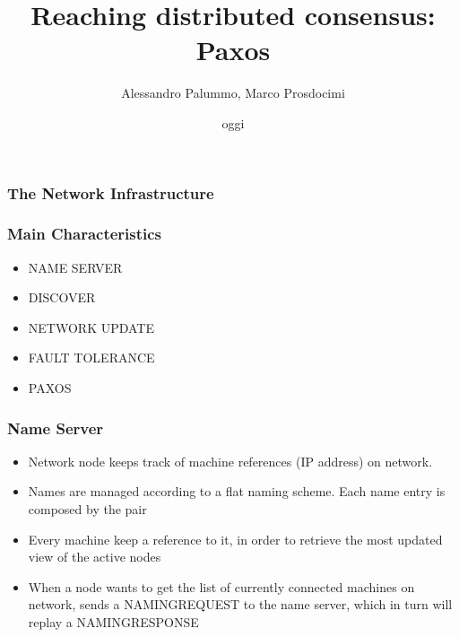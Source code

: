 \documentclass{beamer}
\title{Reaching distributed consensus: Paxos}
\author{Alessandro Palummo, Marco Prosdocimi}
\date{oggi}
\begin{document}
\begin{frame}
  \maketitle
\end{frame}

\begin{frame}
  \frametitle{The Network Infrastructure}
  
\end{frame}

\begin{frame}
  \frametitle{Main Characteristics}

  \begin{itemize}
  \item NAME SERVER
  \item DISCOVER
  \item NETWORK UPDATE
  \item FAULT TOLERANCE
  \item PAXOS
  \end{itemize}

\end{frame}

\begin{frame}
  \frametitle{Name Server}
  \begin{itemize}
  \item Network node keeps track of machine references (IP address) on network.
  \item Names are managed according to a flat naming scheme. Each name entry is composed by the pair 
  \item Every machine keep a reference to it, in order to retrieve the most updated view of the active nodes
  \item When a node wants to get the list of currently connected machines on network, sends a NAMINGREQUEST to the name server, which in turn will replay a NAMINGRESPONSE
  \end{itemize}
\end{frame}
\end{document}
